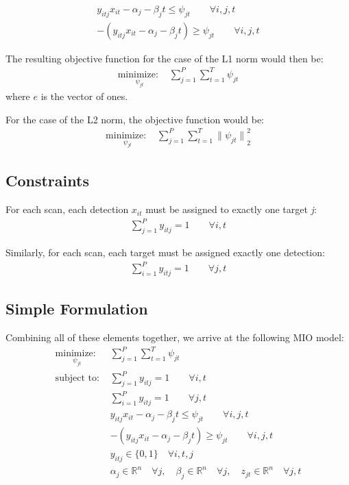\documentclass[journal]{IEEEtran}
\begin{document}
\begin{align}
y_{itj}x_{it} - \alpha_{j} - \beta_{j}t \leq \psi_{jt} \qquad \forall i,j,t\\
-(y_{itj}x_{it} - \alpha_{j} - \beta_{j}t) \geq \psi_{jt} \qquad \forall i,j,t
\end{align}

The resulting objective function for the case of the L1 norm would then be:
\begin{align}
\underset{\psi_{jt}}{\text{minimize: }} & \sum_{j=1}^{P} \sum_{t=1}^{T} \psi_{jt}
\end{align}
where $e$ is the vector of ones. 

For the case of the L2 norm, the objective function would be:
\begin{align}
\underset{\psi_{jt}}{\text{minimize: }} & \sum_{j=1}^{P} \sum_{t=1}^{T} {\|\psi_{jt}\|}^{2}_{2}
\end{align}

\subsection{Constraints}
For each scan, each detection $x_{it}$ must be assigned to exactly one target \textit{j}:
\begin{align}
\sum_{j=1}^{P} y_{itj} = 1 \qquad \forall i,t
\end{align}

Similarly, for each scan, each target must be assigned exactly one detection:
\begin{align}
\sum_{i=1}^{P} y_{itj} = 1 \qquad \forall j,t
\end{align}

\subsection{Simple Formulation}
Combining all of these elements together, we arrive at the following MIO model:
\begin{align*}
\underset{\psi_{jt}}{\text{minimize: }} & \sum_{j=1}^{P} \sum_{t=1}^{T} \psi_{jt} \\
\text{subject to: }	& \sum_{j=1}^{P} y_{itj} = 1 \qquad \forall i,t\\
				& \sum_{i=1}^{P} y_{itj} = 1 \qquad \forall j,t\\
				& y_{itj}x_{it} - \alpha_{j} - \beta_{j}t \leq \psi_{jt} \qquad \forall i,j,t\\
				& -(y_{itj}x_{it} - \alpha_{j} - \beta_{j}t) \geq \psi_{jt} \qquad \forall i,j,t\\
			 	& y_{itj} \in \{0,1\} \quad \forall i,t,j\\
				& \alpha_{j} \in \mathbb{R}^n \quad \forall j,\quad \beta_{j} \in \mathbb{R}^n \quad \forall j, \quad z_{jt} \in \mathbb{R}^n \quad \forall j,t
\end{align*}
\end{document}

